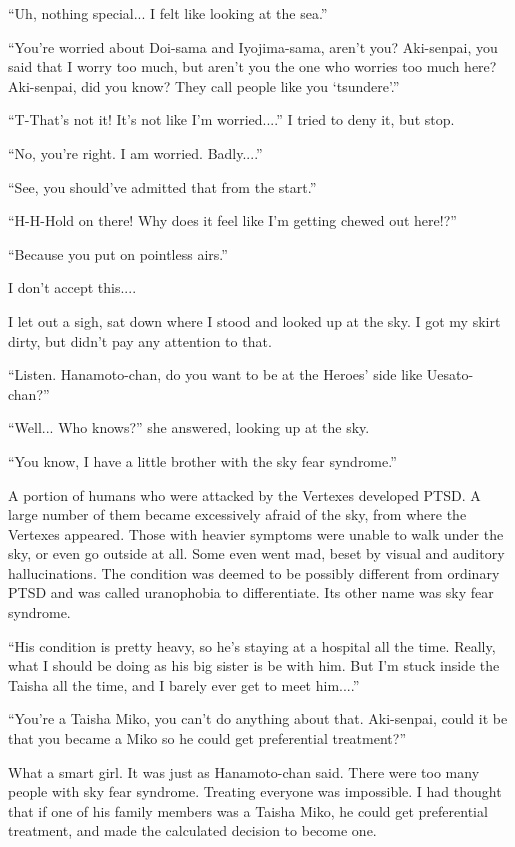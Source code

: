 ``Uh, nothing special... I felt like looking at the sea.''

``You're worried about Doi-sama and Iyojima-sama, aren't you? Aki-senpai, you said that I worry too much, but aren't you the one who worries too much here? Aki-senpai, did you know? They call people like you `tsundere'.''

``T-That's not it! It's not like I'm worried....'' I tried to deny it, but stop.

``No, you're right. I am worried. Badly....''

``See, you should've admitted that from the start.''

``H-H-Hold on there! Why does it feel like I'm getting chewed out here!?''

``Because you put on pointless airs.''

I don't accept this....

I let out a sigh, sat down where I stood and looked up at the sky. I got my skirt dirty, but didn't pay any attention to that.

``Listen. Hanamoto-chan, do you want to be at the Heroes' side like Uesato-chan?''

``Well... Who knows?'' she answered, looking up at the sky.

``You know, I have a little brother with the sky fear syndrome.''

A portion of humans who were attacked by the Vertexes developed PTSD. A large number of them became excessively afraid of the sky, from where the Vertexes appeared. Those with heavier symptoms were unable to walk under the sky, or even go outside at all. Some even went mad, beset by visual and auditory hallucinations. The condition was deemed to be possibly different from ordinary PTSD and was called uranophobia to differentiate. Its other name was sky fear syndrome.

``His condition is pretty heavy, so he's staying at a hospital all the time. Really, what I should be doing as his big sister is be with him. But I'm stuck inside the Taisha all the time, and I barely ever get to meet him....''

``You're a Taisha Miko, you can't do anything about that. Aki-senpai, could it be that you became a Miko so he could get preferential treatment?''

What a smart girl. It was just as Hanamoto-chan said. There were too many people with sky fear syndrome. Treating everyone was impossible. I had thought that if one of his family members was a Taisha Miko, he could get preferential treatment, and made the calculated decision to become one.

